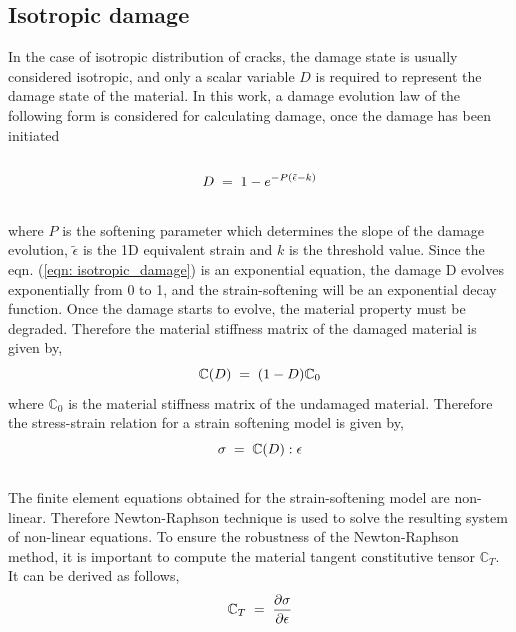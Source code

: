 \documentclass[12pt]{report}
\begin{document}
\subsection{Isotropic damage}
\indent\indent\indent In the case of isotropic distribution of cracks, the damage state is usually considered isotropic, and only a scalar variable $D$ is required to represent the damage state of the material. In this work, a damage evolution law of the following form is considered for calculating damage, once the damage has been initiated
\\
\\
\begin{equation}
  \large{ D \; = \; 1 - e^{-P(\tilde{\epsilon} - k)}}
  \label{eqn: isotropic_damage}
\end{equation} 
\\
where $P$ is the softening parameter which determines the slope of the damage evolution, $\tilde{\epsilon}$ is the 1D equivalent strain and $k$ is the threshold value. Since the eqn. (\ref{eqn: isotropic_damage}) is an exponential equation, the damage D evolves exponentially from 0 to 1, and the strain-softening will be an exponential decay function. Once the damage starts to evolve, the material property must be degraded. Therefore the material stiffness matrix of the  damaged material is given by,\\
\begin{equation}
\large{\mathbb{C}(D) \; = \; (1  - D) \mathbb{C}_{0} }
\end{equation} 
where $\mathbb{C}_{0}$ is the material stiffness matrix of the undamaged material. Therefore the stress-strain relation for a strain softening model is given by,\\
\begin{equation}
\large{\sigma \; = \; \mathbb{C}(D) : \epsilon }  
\end{equation}
\\
The finite element equations obtained for the strain-softening model are non-linear. Therefore Newton-Raphson technique is used to solve the resulting system of non-linear equations. To ensure the robustness of the Newton-Raphson method, it is important to compute the material tangent constitutive tensor $\mathbb{C}_{T}$. It can be derived as follows,\\
\begin{equation*}
\large{ \mathbb{C}_{T}  \; = \;\frac{\partial \sigma}{\partial \epsilon}  }
\end{equation*}
\end{document}
